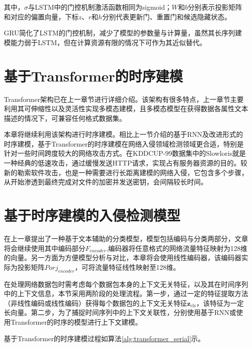 其中，$\sigma$与LSTM中的门控机制激活函数相同为sigmoid；$W$和$b$分别表示投影矩阵和对应的偏置向量，下标$z$、$r$和$h$分别代表更新门、重置门和候选隐藏状态。

GRU简化了LSTM的门控机制，减少了模型的参数量与计算量，虽然其长序列建模能力弱于LSTM，但在计算资源有限的情况下可作为其近似替代。

\section{基于Transformer的时序建模}
Transformer架构已在上一章节进行详细介绍。该架构有很多特点，上一章节主要利用其可伸缩性以及灵活性实现多模态建模，且多模态模型在获得数据各属性文本描述的情况下，可兼容任何格式数据集。

本章将继续利用该架构进行时序建模。相比上一节介绍的基于RNN及改进形式的时序建模，基于Transformer的时序建模在网络入侵领域检测领域更合适，特别是针对一些时间跨度较大的网络攻击方式。在KDDCUP-99数据集中的Slowloris就是一种经典的低速攻击，通过缓慢发送HTTP请求，实现占有服务器资源的目的。较新的勒索软件攻击，也是一种需要进行长距离建模的网络入侵，它包含多个步骤，从开始渗透到最终完成对文件的加密并发送密钥，会间隔较长时间。

\section{基于时序建模的入侵检测模型}
在上一章提出了一种基于文本辅助的分类模型，模型包括编码与分类两部分，文章将会继续使用其中编码部分$F_{encoder}$,编码器将任意格式的网络流量特征映射为128维的向量。另一方面为方便模型分析与对比，本章将会使用线性编码器，该编码器实际为投影矩阵$Porj_{encoder}$，可将流量特征线性映射至128维。

在处理网络数据包时需考虑每个数据包本身的上下文无关特征，以及其在时间序列中的上下文信息，本节采用两阶段的处理流程。第一步，通过一定的特征提取方法（非线性编码或线性编码）获得每个数据包的上下文无关特征$\mathbf{z}_{\mathrm{cls}}$，该特征为一定长向量。第二步，为了捕捉时间序列中的上下文关联性，分别使用基于RNN或使用Transformer的时序的模型进行上下文建模。

基于Transformer的时序建模过程如算法\ref{alg:transformer_serial}示。

